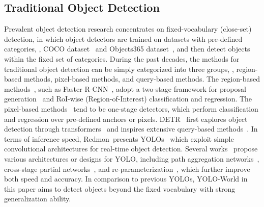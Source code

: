 \documentclass[10pt,twocolumn,letterpaper]{article}
\newcommand{\name}{YOLO-World}
\begin{document}
\subsection{Traditional Object Detection}
Prevalent object detection research concentrates on fixed-vocabulary (close-set) detection, in which object detectors are trained on datasets with pre-defined categories, \eg, COCO dataset~\cite{COCO} and Objects365 dataset~\cite{Shao2019Objects365AL}, and then detect objects within the fixed set of categories.
During the past decades, the methods for traditional object detection can be simply categorized into three groups, \ie, region-based methods, pixel-based methods, and query-based methods.
The region-based methods~\cite{RCNN,FastRCNN,FasterRCNN,FPN,MaskR-CNN}, such as Faster R-CNN~\cite{FasterRCNN}, adopt a two-stage framework for proposal generation~\cite{FasterRCNN} and RoI-wise (Region-of-Interest) classification and regression.
The pixel-based methods~\cite{YOLO,SSD,RetinaNet,FCOS,ATSS} tend to be one-stage detectors, which perform classification and regression over pr\textbf{}e-defined anchors or pixels.
DETR~\cite{DETR} first explores object detection through transformers~\cite{Transformer} and inspires extensive query-based methods~\cite{DeformableDETR}.
In terms of inference speed, Redmon~\etal presents YOLOs~\cite{YOLO,YOLO9000,Yolov3} which exploit simple convolutional architectures for real-time object detection.
Several works~\cite{YOLOv6,YOLOv7,YOLOX,PPYOLO,PPYOLOE} propose various architectures or designs for YOLO, including path aggregation networks~\cite{PAFPN}, cross-stage partial networks~\cite{CSPNet}, and re-parameterization~\cite{RepVGG}, which further improve both speed and accuracy.
In comparison to previous YOLOs, \name{} in this paper aims to detect objects beyond the fixed vocabulary with strong generalization ability.
\end{document}
